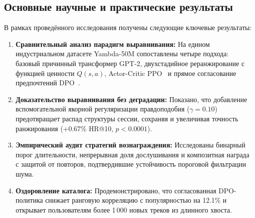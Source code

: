 \subsection{Основные научные и практические результаты}
В рамках проведённого исследования получены следующие ключевые результаты:
\begin{enumerate}
    \item \textbf{Сравнительный анализ парадигм выравнивания:} На едином индустриальном датасете Yambda-50M сопоставлены четыре подхода: базовый причинный трансформер GPT-2, двухстадийное реранжирование с функцией ценности $Q(s,a)$, Actor-Critic PPO~\cite{schulman2017proximal} и прямое согласование предпочтений DPO~\cite{rafailov2023direct}.
    \item \textbf{Доказательство выравнивания без деградации:} Показано, что добавление вспомогательной якорной регуляризации правдоподобия ($\gamma=0.10$) предотвращает распад структуры сессии, сохраняя и увеличивая точность ранжирования (+0.67\% HR@10, $p < 0.0001$).
    \item \textbf{Эмпирический аудит стратегий вознаграждения:} Исследованы бинарный порог длительности, непрерывная доля дослушивания и композитная награда с защитой от повторов, подтвердившие устойчивость пороговой фильтрации шума.
    \item \textbf{Оздоровление каталога:} Продемонстрировано, что согласованная DPO-политика снижает ранговую корреляцию с популярностью на 12.1\% и открывает пользователям более 1\,000 новых треков из длинного хвоста.
\end{enumerate}
